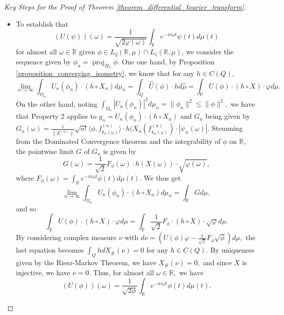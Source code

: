 \documentclass[10pt,a4paper]{amsart}
\def \Proj{\operatorname{proj}}
\def \HMU{\hat{\mu}}
\def \HU{\hat{U}}
\def \LL{\langle}
\def \RR{\rangle}
\begin{document}
\begin{proof}[Key Steps for the Proof of Theorem \ref{theorem_differential_fourier_transform}]
\begin{itemize}
		\item To establish that $$(U(\psi))(\omega)=\frac{1}{\sqrt{2\varphi(\omega)}}\int_{\mathbb{R}}e^{-\pi i \omega t} \psi(t)d\mu(t)$$ for almost all $\omega\in \mathbb{R}$ given $\phi\in L_2(\mathbb{R},\mu)\cap L_1(\mathbb{R},\mu)$, we consider the sequence given by $\phi_n=\Proj_{H_n}\phi.$ One one hand, by Proposition \ref{proposition_converging_isometry}, we know that for any $h\in C(Q),$ $$\lim_{n\rightarrow\infty}\int_{\Omega_n} U_n(\phi_n)\cdot (h\circ X_n)d\mu_n=\int_{Q}\HU(\phi)\cdot hd\HMU=\int_{\mathbb{R}}U(\phi)\cdot (h\circ X)\cdot\varphi d\mu.$$ On the other hand, noting $\int_{\Omega_n}|U_n(\phi_n)|^2d\mu_n=\|\phi_n\|^2\leq \|\phi\|^2,$ we have that Property 2 applies to $g_n=U_n(\phi_n)\cdot(h\circ X_n)$ and $G_n$ being given by $G_n(\omega)=\frac{1}{\|E^{(n)}\|}\sqrt{n!}\LL \phi, f_{k_n(\omega)}^{(n)}\RR\cdot h(X_n(f_{k_n(\omega)}^{(n)})\cdot|\psi_n(\omega)|.$ Stemming from the Dominated Convergence theorem and the integrability of $\phi$ on $\mathbb{R}$, the pointwise limit $G$ of $G_n$ is given by $$G(\omega)=\frac{1}{\sqrt{2}}F_{\phi}(\omega)\cdot h(X(\omega))\cdot\sqrt{\varphi(\omega)},$$ where $F_{\phi}(\omega)=\int_{\mathbb{R}}e^{-\pi i \omega t}\phi(t)d\mu(t).$ We thus get $$\lim_{n\rightarrow\infty}\int_{\Omega_n} U_n(\phi_n)\cdot (h\circ X_n)d\mu_n=\int_{\mathbb{R}}Gd\mu,$$ and so $$\int_{\mathbb{R}}U(\phi)\cdot (h\circ X)\cdot\varphi d\mu=\int_{\mathbb{R}}\frac{1}{\sqrt{2}}F_{\phi}\cdot (h\circ X)\cdot \sqrt{\varphi}d\mu.$$ By considering complex measure $\nu$ with $d\nu=(U(\phi)\varphi-\frac{1}{\sqrt{2}}F_{\phi}\sqrt{\phi})d\mu,$ the last equation becomes $\int_Qh dX_{\#}(\nu)=0$ for any $h\in C(Q).$ By uniqueness given by the Riesz-Markov Theorem, we have $X_{\#}(\nu)=0,$ and since $X$ is injective, we have $\nu=0.$ Thus, for almost all $\omega\in\mathbb{R},$ we have $$(U(\phi))(\omega)=\frac{1}{\sqrt{2\phi}}\int_{\mathbb{R}}e^{-\pi i \omega t}\phi(t)d\mu(t).$$

\end{itemize}
\end{proof}
\end{document}
